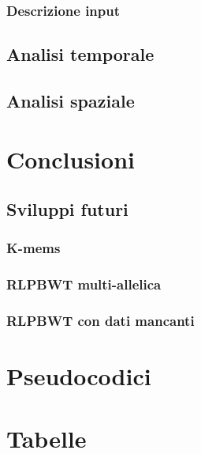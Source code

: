 \documentclass[a4paper,12pt, oneside]{book}
\begin{document}
\subsection{Descrizione input}
\section{Analisi temporale}
\section{Analisi spaziale}
\chapter{Conclusioni}
\section{Sviluppi futuri}
\subsection{K-mems}
\subsection{RLPBWT multi-allelica}
\subsection{RLPBWT con dati mancanti}
\printbibliography[title={Bibliografia e sitografia}]
\appendix
\chapter{Pseudocodici}
\chapter{Tabelle}

\end{document}
